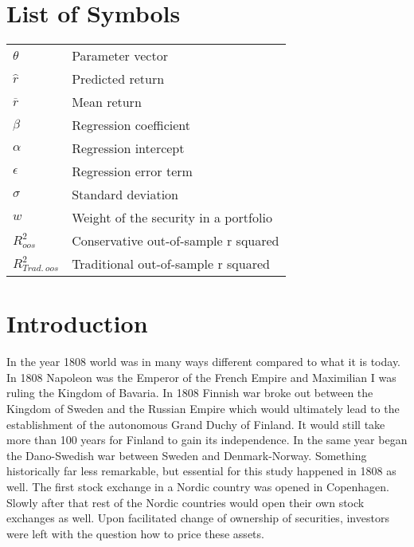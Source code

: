 \documentclass[12pt]{article}
\begin{document}
\section*{List of Symbols}
\begin{tabular}{l l}
$\theta$ & Parameter vector\\
$\hat{r}$ & Predicted return\\
$\overline{r}$ & Mean return\\
$\beta$ & Regression coefficient \\
$\alpha$ & Regression intercept\\
$\epsilon$ & Regression error term\\
$\sigma$ & Standard deviation\\
$w$ & Weight of the security in a portfolio\\
$R^2_{oos}$ & Conservative out-of-sample r squared \\
$R^2_{Trad. \ oos}$ & Traditional out-of-sample r squared \\
\end{tabular}

\newpage

\section{Introduction} \label{Introduction}
In the year 1808 world was in many ways different compared to what it is today. In 1808 Napoleon was the Emperor of the French Empire and Maximilian I was ruling the Kingdom of Bavaria. In 1808 Finnish war broke out between the Kingdom of Sweden and the Russian Empire which would ultimately lead to the establishment of the autonomous Grand Duchy of Finland. It would still take more than 100 years for Finland to gain its independence. In the same year began the Dano-Swedish war between Sweden and Denmark-Norway. Something historically far less remarkable, but essential for this study happened in 1808 as well. The first stock exchange in a Nordic country was opened in Copenhagen\footnotemark. Slowly after that rest of the Nordic countries would open their own stock exchanges as well. Upon facilitated change of ownership of securities, investors were left with the question how to price these assets. \par

\end{document}
